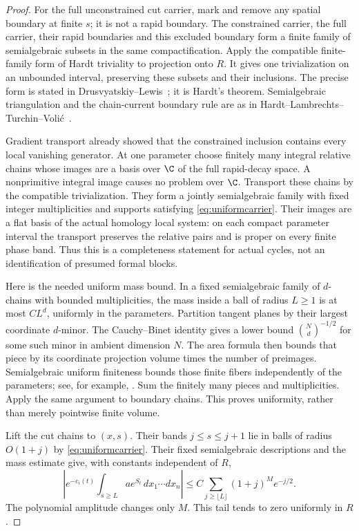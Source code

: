 \begin{proof}
For the full unconstrained cut carrier, mark and remove any
spatial boundary at finite $s$; it is not a rapid boundary.
The constrained carrier, the full carrier, their rapid boundaries
and this excluded boundary form a finite family of semialgebraic
subsets in the same compactification. Apply the compatible
finite-family form of Hardt triviality to projection onto $R$.
It gives one trivialization on an unbounded interval, preserving
these subsets and their inclusions. The precise form is stated
in Drusvyatskiy--Lewis~\cite[Theorem~2.25]{DrusvyatskiyLewis};
it is Hardt's theorem. Semialgebraic triangulation and the
chain-current boundary rule are as in
Hardt--Lambrechts--Turchin--Voli\'c~\cite[Sections~2.1 and~3,
especially Theorem~3.5]{HLTV}.

Gradient transport already showed that the constrained inclusion
contains every local vanishing generator. At one parameter choose
finitely many integral relative chains whose images are a basis
over $\C$ of the full rapid-decay space. A nonprimitive integral
image causes no problem over $\C$. Transport these chains by
the compatible trivialization. They form a jointly semialgebraic
family with fixed integer multiplicities and supports satisfying
\eqref{eq:uniformcarrier}. Their images are a flat basis of the
actual homology local system: on each compact parameter interval
the transport preserves the relative pairs and is proper on
every finite phase band. Thus this is a completeness statement
for actual cycles, not an identification of presumed formal blocks.

Here is the needed uniform mass bound. In a fixed semialgebraic
family of $d$-chains with bounded multiplicities, the mass inside
a ball of radius $L\ge1$ is at most $C L^d$, uniformly in the
parameters. Partition tangent planes by their largest coordinate
$d$-minor. The Cauchy--Binet identity gives a lower bound
$\binom Nd^{-1/2}$ for some such minor in ambient dimension $N$.
The area formula then bounds that piece by its coordinate
projection volume times the number of preimages. Semialgebraic
uniform finiteness bounds those finite fibers independently of
the parameters; see, for example,
\cite[Theorem~2.32]{DrusvyatskiyLewis}. Sum the finitely many
pieces and multiplicities. Apply the same argument to boundary
chains. This proves uniformity, rather than merely pointwise
finite volume.

Lift the cut chains to $(x,s)$. Their bands $j\le s\le j+1$
lie in balls of radius $O(1+j)$ by
\eqref{eq:uniformcarrier}. Their fixed semialgebraic descriptions
and the mass estimate give, with constants independent of $R$,
\begin{equation}\label{eq:uniformcuttail}
 \left|e^{-c_i(t)}\int_{s\ge L}a e^{S_t}\,dx_1\cdots dx_n\right|
 \le C\sum_{j\ge\lfloor L\rfloor}(1+j)^M e^{-j/2}.
\end{equation}
The polynomial amplitude changes only $M$. This tail tends to
zero uniformly in $R$.


\end{proof}

